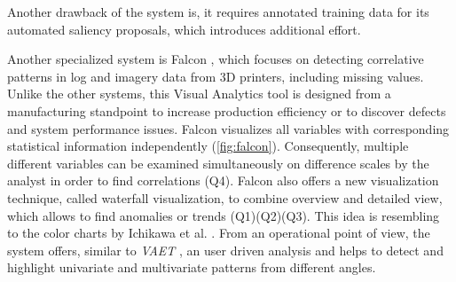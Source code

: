 \documentclass[electronic]{vgtc}             %
\begin{document}
Another drawback of the system is, it requires annotated training data for its automated saliency proposals, which introduces additional effort.

Another specialized system is Falcon \cite{steed:2017}, which focuses on detecting correlative patterns in log and imagery data from 3D printers, including missing values.
Unlike the other systems, this Visual Analytics tool is designed from a manufacturing standpoint to increase production efficiency or to discover defects and system performance issues.
Falcon visualizes all variables with corresponding statistical information independently (\autoref{fig:falcon}). 
Consequently, multiple different variables can be examined simultaneously  on difference scales by the analyst in order to find correlations (Q4).
Falcon also offers a new visualization technique, called waterfall visualization, to combine overview and detailed view, which allows to find anomalies or trends (Q1)(Q2)(Q3). 
This idea is resembling to the color charts by Ichikawa et al. \cite{ichikawa:2002}.
From an operational point of view, the system offers, similar to \textit{VAET} \cite{Xie:2014}, an user driven analysis and helps to detect and highlight univariate and multivariate patterns from different angles.
\end{document}
